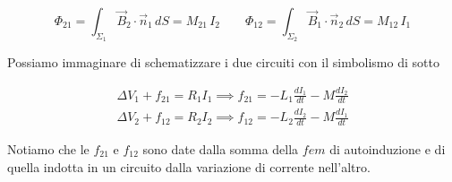 \[
	\Phi_{21} = \int_{\Sigma_1}  \vec{B}_2 \cdot \vec{n}_1 \, dS = M_{21}\,I_2 \qquad \Phi_{12} = \int_{\Sigma_2}  \vec{B}_1 \cdot \vec{n}_2 \, dS = M_{12}\,I_1
\]

Possiamo immaginare di schematizzare i due circuiti con il simbolismo di sotto

\begin{gather*}
	\Delta V_1 + f_{21} = R_1 I_1 \implies f_{21} = - L_1  \frac{dI_1}{dt} - M \frac{dI_2}{dt} \\
	\Delta V_2 + f_{12} = R_2 I_2 \implies f_{12} = - L_2  \frac{dI_2}{dt} - M \frac{dI_1}{dt}
\end{gather*}

Notiamo che le $f_{21} $ e $f_{12} $ sono date dalla somma della $fem$ di autoinduzione e di quella indotta in un circuito dalla variazione di corrente nell'altro.

